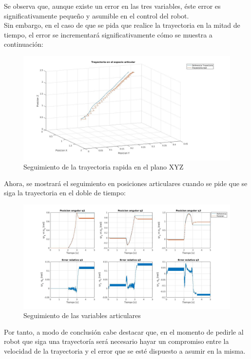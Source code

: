 \begin{itemize}
\newpage
Se observa que, aunque existe un error en las tres variables, éste error es significativamente pequeño y asumible en el control del robot.\\
Sin embargo, en el caso de que se pida que realice la trayectoria en la mitad de tiempo, el error se incrementará significativamente cómo se muestra a continuación:

\begin{figure}[h!]
	\centering
	\includegraphics[width=.8\textwidth]{exp4_trayPDidealSR_rapido}
	\caption{Seguimiento de la trayectoria rapida en el plano XYZ}
\end{figure}

\newpage
Ahora, se mostrará el seguimiento en posiciones articulares cuando se pide que se siga la trayectoria en el doble de tiempo:

\begin{figure}[h!]
	\centering
	\includegraphics[width=.8\textwidth]{exp4_posPDidealSR_rapido}
	\caption{Seguimiento de las variables articulares}
\end{figure}

Por tanto, a modo de conclusión cabe destacar que, en el momento de pedirle al robot que siga una trayectoría será necesario hayar un compromiso entre la velocidad de la trayectoria y el error que se esté dispuesto a asumir en la misma.\\


\end{itemize}
